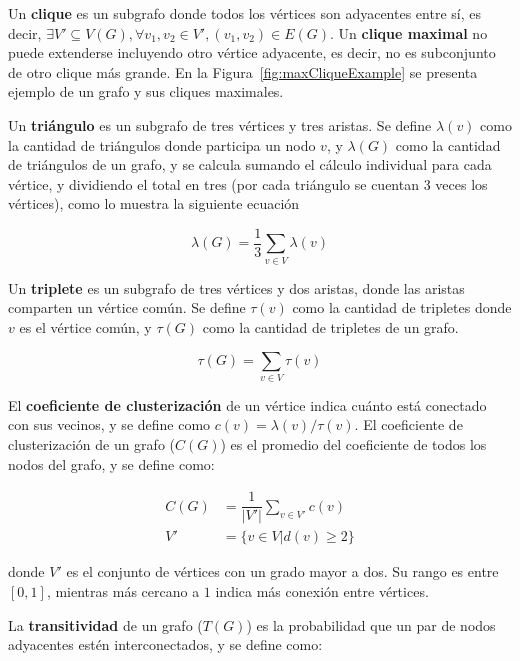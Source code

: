 

Un \textbf{clique} es un subgrafo donde todos los vértices son adyacentes entre sí, es decir, $\exists V' \subseteq V(G), \forall v_{1}, v_{2} \in V', (v_{1}, v_{2}) \in E(G) $. Un \textbf{clique maximal} no puede extenderse incluyendo otro vértice adyacente, es decir, no es subconjunto de otro clique más grande. En la Figura~\ref{fig:maxCliqueExample} se presenta ejemplo de un grafo y sus cliques maximales.

Un \textbf{triángulo} es un subgrafo de tres vértices y tres aristas. Se define $\lambda(v)$ como la cantidad de triángulos donde participa un nodo $v$, y $\lambda(G)$ como la cantidad de triángulos de un grafo, y se calcula sumando el cálculo individual para cada vértice, y dividiendo el total en tres (por cada triángulo se cuentan 3 veces los vértices), como lo muestra la siguiente ecuación

\begin{equation}
	\lambda(G) = \dfrac{1}{3} \sum_{v \in V} \lambda(v) \label{eq:triangles}
\end{equation}

Un \textbf{triplete} es un subgrafo de tres vértices y dos aristas, donde las aristas comparten un vértice común. Se define $\tau(v)$ como la cantidad de tripletes donde $v$ es el vértice común, y $\tau(G)$ como la cantidad de tripletes de un grafo.

\begin{equation}
	\tau(G) = \sum_{v \in V} \tau(v) \label{eq:triplets}
\end{equation}

El \textbf{coeficiente de clusterización} de un vértice indica cuánto está conectado con sus vecinos, y se define como $c(v) =  \lambda(v) / \tau(v)$. El coeficiente de clusterización de un grafo ($C(G)$) es el promedio del coeficiente de todos los nodos del grafo, y se define como:

\begin{align}
	C(G) &= \dfrac{1}{|V'|} \sum_{v \in V'} c(v) \label{eq:CC} \\
	V' &= \{ v \in V | d(v) \geq 2 \} \nonumber
\end{align}

\noindent donde $V'$ es el conjunto de vértices con un grado mayor a dos. Su rango es entre $[0, 1]$, mientras más cercano a $1$ indica más conexión entre vértices.

La \textbf{transitividad} de un grafo ($T(G)$) es la probabilidad que un par de nodos adyacentes estén interconectados, y se define como:

